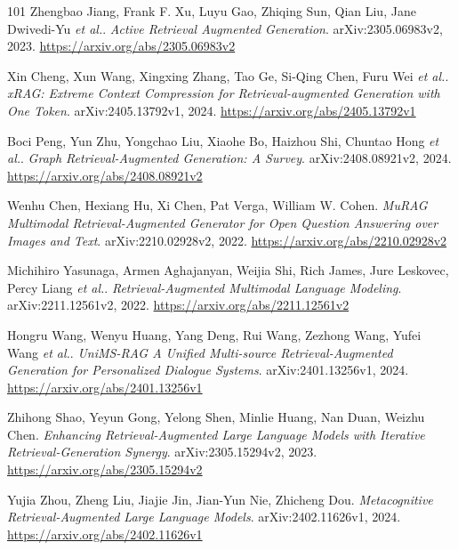 \documentclass[11pt,a4paper]{article}
\begin{document}
\begin{thebibliography}{101}
Zhengbao Jiang, Frank F. Xu, Luyu Gao, Zhiqing Sun, Qian Liu, Jane Dwivedi-Yu \emph{et al.}.
\newblock \emph{Active Retrieval Augmented Generation}.
\newblock arXiv:2305.06983v2, 2023.
\newblock \url{https://arxiv.org/abs/2305.06983v2}

Xin Cheng, Xun Wang, Xingxing Zhang, Tao Ge, Si-Qing Chen, Furu Wei \emph{et al.}.
\newblock \emph{xRAG: Extreme Context Compression for Retrieval-augmented Generation with One Token}.
\newblock arXiv:2405.13792v1, 2024.
\newblock \url{https://arxiv.org/abs/2405.13792v1}

Boci Peng, Yun Zhu, Yongchao Liu, Xiaohe Bo, Haizhou Shi, Chuntao Hong \emph{et al.}.
\newblock \emph{Graph Retrieval-Augmented Generation: A Survey}.
\newblock arXiv:2408.08921v2, 2024.
\newblock \url{https://arxiv.org/abs/2408.08921v2}

Wenhu Chen, Hexiang Hu, Xi Chen, Pat Verga, William W. Cohen.
\newblock \emph{MuRAG Multimodal Retrieval-Augmented Generator for Open Question Answering over Images and Text}.
\newblock arXiv:2210.02928v2, 2022.
\newblock \url{https://arxiv.org/abs/2210.02928v2}

Michihiro Yasunaga, Armen Aghajanyan, Weijia Shi, Rich James, Jure Leskovec, Percy Liang \emph{et al.}.
\newblock \emph{Retrieval-Augmented Multimodal Language Modeling}.
\newblock arXiv:2211.12561v2, 2022.
\newblock \url{https://arxiv.org/abs/2211.12561v2}

Hongru Wang, Wenyu Huang, Yang Deng, Rui Wang, Zezhong Wang, Yufei Wang \emph{et al.}.
\newblock \emph{UniMS-RAG A Unified Multi-source Retrieval-Augmented Generation for Personalized Dialogue Systems}.
\newblock arXiv:2401.13256v1, 2024.
\newblock \url{https://arxiv.org/abs/2401.13256v1}

Zhihong Shao, Yeyun Gong, Yelong Shen, Minlie Huang, Nan Duan, Weizhu Chen.
\newblock \emph{Enhancing Retrieval-Augmented Large Language Models with Iterative Retrieval-Generation Synergy}.
\newblock arXiv:2305.15294v2, 2023.
\newblock \url{https://arxiv.org/abs/2305.15294v2}

Yujia Zhou, Zheng Liu, Jiajie Jin, Jian-Yun Nie, Zhicheng Dou.
\newblock \emph{Metacognitive Retrieval-Augmented Large Language Models}.
\newblock arXiv:2402.11626v1, 2024.
\newblock \url{https://arxiv.org/abs/2402.11626v1}


\end{thebibliography}
\end{document}
